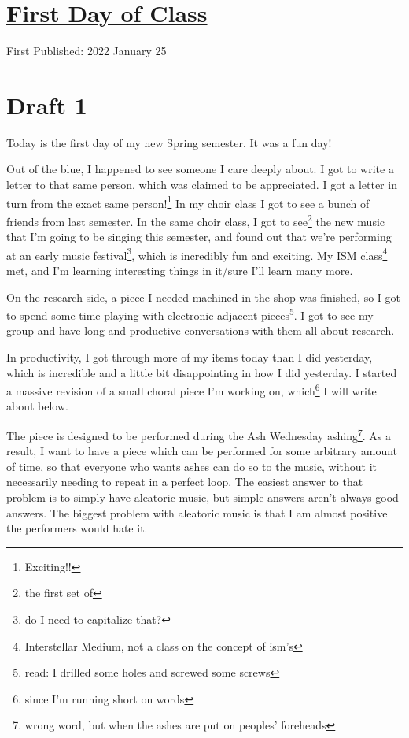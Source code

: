 \documentclass[12pt]{article}[titlepage]
\newcommand{\1}{\={a}}
\newcommand{\2}{\={e}}
\newcommand{\3}{\={\i}}
\newcommand{\4}{\=o}
\newcommand{\5}{\=u}
\newcommand{\6}{\={A}}
\renewcommand{\,}{\textsuperscript{,}}
\begin{document}
\doublespacing
\section{\href{first-day-of-class-S2022.html}{First Day of Class}}
First Published: 2022 January 25

\section{Draft 1}
Today is the first day of my new Spring semester.
It was a fun day!

Out of the blue, I happened to see someone I care deeply about.
I got to write a letter to that same person, which was claimed to be appreciated.
I got a letter in turn from the exact same person!\footnote{Exciting!!}
In my choir class I got to see a bunch of friends from last semester.
In the same choir class, I got to see\footnote{the first set of} the new music that I'm going to be singing this semester, and found out that we're performing at an early music festival\footnote{do I need to capitalize that?}, which is incredibly fun and exciting.
My ISM class\footnote{Interstellar Medium, not a class on the concept of ism's} met, and I'm learning interesting things in it/sure I'll learn many more.

On the research side, a piece I needed machined in the shop was finished, so I got to spend some time playing with electronic-adjacent pieces\footnote{read: I drilled some holes and screwed some screws}.
I got to see my group and have long and productive conversations with them all about research.

In productivity, I got through more of my items today than I did yesterday, which is incredible and a little bit disappointing in how I did yesterday.
I started a massive revision of a small choral piece I'm working on, which\footnote{since I'm running short on words} I will write about below.

The piece is designed to be performed during the Ash Wednesday ashing\footnote{wrong word, but when the ashes are put on peoples' foreheads}.
As a result, I want to have a piece which can be performed for some arbitrary amount of time, so that everyone who wants ashes can do so to the music, without it necessarily needing to repeat in a perfect loop.
The easiest answer to that problem is to simply have aleatoric music, but simple answers aren't always good answers.
The biggest problem with aleatoric music is that I am almost positive the performers would hate it.
\end{document}
